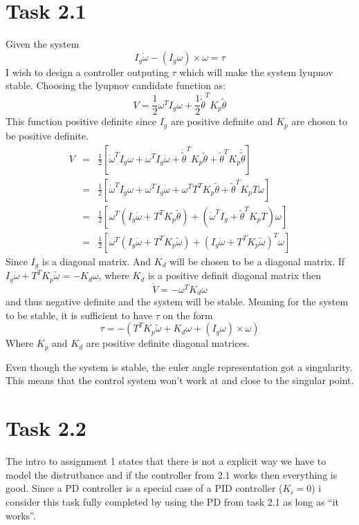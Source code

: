 \documentclass[11pt]{article}
\begin{document}
\section*{Task 2.1}
Given the system
\[I_g \dot \omega - (I_g \omega) \times \omega = \tau \]
I wish to design a controller outputing $\tau$ which will make the system lyupnov stable. Choosing the lyupnov candidate function as:
\[V = \frac{1}{2} \omega^T I_g \omega + \frac{1}{2} \dot \tilde \theta^T K_p \tilde \theta \]
This function  positive definite since $I_g$ are positive definite and $K_p$ are chosen to be positive definite.
\begin{eqnarray*}
\dot V &=& \frac{1}{2} [ \dot \omega^T I_g \omega + \omega^T I_g \dot \omega + \dot \tilde \theta^T K_p \tilde \theta + \tilde \theta^T K_p \dot \tilde \theta ] \\
&=& \frac{1}{2} [ \dot \omega^T I_g \omega + \omega^T I_g \dot \omega + \omega^T T^T K_p \tilde \theta + \tilde \theta^T K_p T \omega ] \\
&=& \frac{1}{2} [\omega^T ( I_g \dot \omega + T^T K_p \tilde \theta) + (\dot \omega^T I_g + \tilde \theta^T K_p T) \omega ] \\
&=& \frac{1}{2} [\omega^T (I_g \dot \omega + T^T K_p \tilde \omega) + (I_g \dot \omega + T^T K_p \tilde \omega)^T \omega ] 
\end{eqnarray*}
Since $I_g$ is a diagonal matrix. And $K_d$ will be chosen to be a diagonal matrix. If $I_g \dot \omega + T^T K_p \tilde \omega = - K_d \omega$, where $K_d$ is a positive definit diagonal matrix then 
\[\dot V = - \omega^T K_d \omega \]
and thus negative definite and the system will be stable. Meaning for the system to be stable, it is sufficient to have $\tau$ on the form
\[ \tau = -(T^T K_p \tilde \omega + K_d \omega + (I_g \omega) \times \omega) \]
Where $K_p$ and $K_d$ are positive definite diagonal matrices.

Even though the system is stable, the euler angle representation got a singularity. This means that the control system won't work at and close to the singular point.


\section*{Task 2.2}
The intro to assignment 1 states that there is not a explicit way we have to model the distrutbance and if the controller from 2.1 works then everything is good. Since a PD controller is a special case of a PID controller ($K_i = 0$) i consider this task fully completed by using the PD from task 2.1 as long as ``it works''. 
\end{document}
